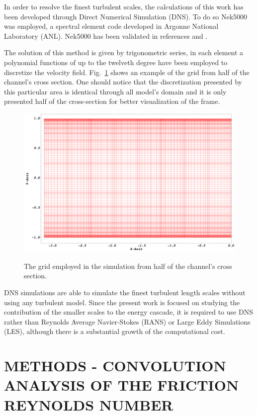 \documentclass[twocolumn,10pt]{asme2e}
\begin{document}
In order to resolve the finest turbulent scales, the calculations of this work has been developed through Direct Numerical Simulation (DNS). To do so Nek5000 was employed, a spectral element code developed in Argonne National Laboratory (ANL). Nek5000 has been validated in references \cite{merzari2013} and \cite{Obabko2011}.

The solution of this method is given by trigonometric series, in each element a polynomial functions of up to the twelveth degree have been employed to discretize the velocity field. Fig.~\ref{fig:mesh} shows an example of the grid from half of the channel's cross section. One should notice that the discretization presented by this particular area is identical through all model's domain and it is only presented half of the cross-section for better visualization of the frame.

\begin{figure}[!htbp]
	\centering
	\scalebox{0.16}
	{\includegraphics{mesh.png}}
	\caption{The grid employed in the simulation from half of the channel's cross section.}
	\label{fig:mesh}
\end{figure}

DNS simulations are able to simulate the finest turbulent length scales without using any turbulent model. Since the present work is focused on studying the contribution of the smaller scales to the energy cascade, it is required to use DNS rather than Reynolds Average Navier-Stokes (RANS) or Large Eddy Simulations (LES), although there is a substantial growth of the computational cost.

\section*{METHODS - CONVOLUTION ANALYSIS OF THE FRICTION REYNOLDS NUMBER}
\end{document}
